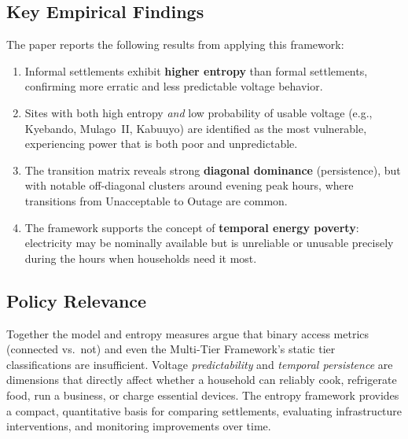 \documentclass[11pt]{article}
\begin{document}
\subsection{Key Empirical Findings}

The paper reports the following results from applying this framework:
\begin{enumerate}
    \item Informal settlements exhibit \textbf{higher entropy} than formal settlements, confirming more erratic and less predictable voltage behavior.
    \item Sites with both high entropy \emph{and} low probability of usable voltage (e.g., Kyebando, Mulago~II, Kabuuyo) are identified as the most vulnerable, experiencing power that is both poor and unpredictable.
    \item The transition matrix reveals strong \textbf{diagonal dominance} (persistence), but with notable off-diagonal clusters around evening peak hours, where transitions from Unacceptable to Outage are common.
    \item The framework supports the concept of \textbf{temporal energy poverty}: electricity may be nominally available but is unreliable or unusable precisely during the hours when households need it most.
\end{enumerate}

\subsection{Policy Relevance}

Together the model and entropy measures argue that binary access metrics (connected vs.\ not) and even the Multi-Tier Framework's static tier classifications are insufficient. Voltage \emph{predictability} and \emph{temporal persistence} are dimensions that directly affect whether a household can reliably cook, refrigerate food, run a business, or charge essential devices. The entropy framework provides a compact, quantitative basis for comparing settlements, evaluating infrastructure interventions, and monitoring improvements over time.
\end{document}
